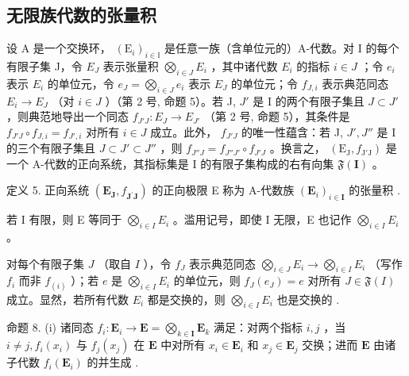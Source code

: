 \subsection{无限族代数的张量积}

设 A 是一个交换环， \((\mathrm{E}_{i})_{i\in\mathbb{I}}\) 是任意一族（含单位元的）A-代数。对 I 的每个有限子集 J，令 \(E_{J}\) 表示张量积 \(\bigotimes_{i\in J}E_{i}\) ，其中诸代数 \(E_{i}\) 的指标 \(i\in J\) ；令 \(e_{i}\) 表示 \(E_{i}\) 的单位元，令 \(e_{J}=\bigotimes_{i\in J}e_{i}\) 表示 \(E_{J}\) 的单位元；令 \(f_{J,i}\) 表示典范同态 \(E_{i}\to E_{J}\) （对 \(i\in J\) ）（第 2 号, 命题 5）。若 J, \(J'\) 是 I 的两个有限子集且 \(J\subset J'\) ，则典范地导出一个同态 \(f_{J'J}:E_{J}\to E_{J'}\) （第 2 号, 命题 5），其条件是 \(f_{J'J}\circ f_{J,i}=f_{J',i}\) 对所有 \(i\in J\) 成立。此外， \(f_{J'J}\) 的唯一性蕴含：若 J, \(J',J''\) 是 I 的三个有限子集且 \(J\subset J'\subset J''\) ，则 \(f_{J''J}=f_{J''J'}\circ f_{J'J}\) 。换言之， \((\mathrm{E}_{\mathrm{J}},f_{\mathrm{J}'\mathrm{J}})\) 是一个 A-代数的正向系统，其指标集是 I 的有限子集构成的右有向集 \(\mathfrak{F}(\mathbf{I})\) 。

定义 5. 正向系统 \((\mathbf{E}_{\mathbf{J}}, f_{\mathbf{J}^{\prime}\mathbf{J}})\) 的正向极限 E 称为 A-代数族 \((\mathbf{E}_i)_{i \in \mathbf{I}}\) 的张量积 .

若 I 有限，则 E 等同于 \(\bigotimes_{i\in I}E_i\) 。滥用记号，即使 I 无限，E 也记作 \(\bigotimes_{i\in I}E_i\) 。

对每个有限子集 \(J\) （取自 \(I\) ），令 \(f_{J}\) 表示典范同态 \(\bigotimes_{i \in J} E_{i} \to \bigotimes_{i \in I} E_{i}\) （写作 \(f_{i}\) 而非 \(f_{(i)}\) ）；若 \(e\) 是 \(\bigotimes_{i \in I} E_{i}\) 的单位元，则 \(f_{J}(e_{J}) = e\) 对所有 \(J \in \mathfrak{F}(I)\) 成立。显然，若所有代数 \(E_{i}\) 都是交换的，则 \(\bigotimes_{i \in I} E_{i}\) 也是交换的 .

命题 8. (i) 诸同态 \(f_{i} \colon \mathbf{E}_{i} \to \mathbf{E} = \bigotimes_{k \in \mathbf{I}} \mathbf{E}_{k}\) 满足：对两个指标 \(i, j\) ，当 \(i \neq j, f_{i}(x_{i})\) 与 \(f_{j}(x_{j})\) 在 \(\mathbf{E}\) 中对所有 \(x_{i} \in \mathbf{E}_{i}\) 和 \(x_{j} \in \mathbf{E}_{j}\) 交换；进而 \(\mathbf{E}\) 由诸子代数 \(f_{i}(\mathbf{E}_{i})\) 的并生成 .


